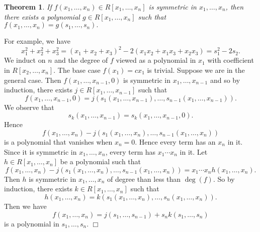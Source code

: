 \documentclass{article}
\newtheorem{theorem}[subsection]{Theorem}
\newenvironment{proof}{\noindent {\bf Proof:}}{$\Box$ \vspace{2 ex}}
\begin{document}
\begin{theorem}\label{thm:elem}
    If $f(x_1,\ldots,x_n)\in R[x_1,\ldots,x_n]$ is symmetric in $x_1,\ldots,x_n$, then there exists a polynomial $g\in R[x_1,\ldots,x_n]$ such that $f(x_1,\ldots,x_n) = g(s_1,\ldots,s_n).$
\end{theorem}
For example, we have
$$x_1^2 + x_2^2 + x_3^2 = (x_1+x_2+x_3)^2 - 2(x_1x_2+x_1x_3+x_2x_3) = s_1^2 - 2s_2.$$
\begin{proof}
    We induct on $n$ and the degree of $f$ viewed as a polynomial in $x_1$ with coefficient in $R[x_2,\ldots,x_n]$. The base case $f(x_1) = cx_1$ is trivial. Suppose we are in the general case. Then $f(x_1,\ldots,x_{n-1},0)$ is symmetric in $x_1,\ldots,x_{n-1}$ and so by induction, there exists $j \in R[x_1,\ldots,x_{n-1}]$ such that
    $$f(x_1,\ldots,x_{n-1},0) = j(s_1(x_1,\ldots,x_{n-1}),\ldots,s_{n-1}(x_1,\ldots,x_{n-1})).$$
    We observe that
    $$s_k(x_1,\ldots,x_{n-1}) = s_k(x_1,\ldots,x_{n-1},0).$$
    Hence $$f(x_1,\ldots,x_{n}) - j(s_1(x_1,\ldots,x_{n}),\ldots, s_{n-1}(x_1,\ldots,x_{n}))$$
    is a polynomial that vanishes when $x_n = 0$. Hence every term has an $x_n$ in it. Since it is symmetric in $x_1,\ldots,x_n$, every term has $x_1\cdots x_n$ in it. Let $h\in R[x_1,\ldots,x_n]$ be a polynomial such that
    $$f(x_1,\ldots,x_{n}) - j(s_1(x_1,\ldots,x_{n}),\ldots, s_{n-1}(x_1,\ldots,x_{n})) = x_1\cdots x_nh(x_1,\ldots,x_n).$$
    Then $h$ is symmetric in $x_1,\ldots,x_n$ of degree than less than $\deg(f)$. So by induction, there exists $k\in R[x_1,\ldots,x_n]$ such that
    $$h(x_1,\ldots,x_n) = k(s_1(x_1,\ldots,x_{n}),\ldots,s_n(x_1,\ldots,x_{n})).$$
    Then we have
    $$f(x_1,\ldots,x_{n}) = j(s_1,\ldots,s_{n-1}) + s_nk(s_1,\ldots,s_n)$$
    is a polynomial in $s_1,\ldots,s_n$.
\end{proof}


\end{document}
